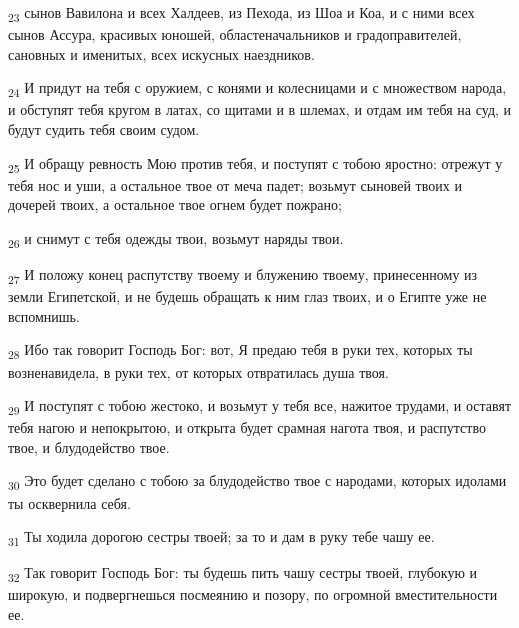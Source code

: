 \begin{tcolorbox}
\textsubscript{23} сынов Вавилона и всех Халдеев, из Пехода, из Шоа и Коа, и с ними всех сынов Ассура, красивых юношей, областеначальников и градоправителей, сановных и именитых, всех искусных наездников.
\end{tcolorbox}
\begin{tcolorbox}
\textsubscript{24} И придут на тебя с оружием, с конями и колесницами и с множеством народа, и обступят тебя кругом в латах, со щитами и в шлемах, и отдам им тебя на суд, и будут судить тебя своим судом.
\end{tcolorbox}
\begin{tcolorbox}
\textsubscript{25} И обращу ревность Мою против тебя, и поступят с тобою яростно: отрежут у тебя нос и уши, а остальное твое от меча падет; возьмут сыновей твоих и дочерей твоих, а остальное твое огнем будет пожрано;
\end{tcolorbox}
\begin{tcolorbox}
\textsubscript{26} и снимут с тебя одежды твои, возьмут наряды твои.
\end{tcolorbox}
\begin{tcolorbox}
\textsubscript{27} И положу конец распутству твоему и блужению твоему, принесенному из земли Египетской, и не будешь обращать к ним глаз твоих, и о Египте уже не вспомнишь.
\end{tcolorbox}
\begin{tcolorbox}
\textsubscript{28} Ибо так говорит Господь Бог: вот, Я предаю тебя в руки тех, которых ты возненавидела, в руки тех, от которых отвратилась душа твоя.
\end{tcolorbox}
\begin{tcolorbox}
\textsubscript{29} И поступят с тобою жестоко, и возьмут у тебя все, нажитое трудами, и оставят тебя нагою и непокрытою, и открыта будет срамная нагота твоя, и распутство твое, и блудодейство твое.
\end{tcolorbox}
\begin{tcolorbox}
\textsubscript{30} Это будет сделано с тобою за блудодейство твое с народами, которых идолами ты осквернила себя.
\end{tcolorbox}
\begin{tcolorbox}
\textsubscript{31} Ты ходила дорогою сестры твоей; за то и дам в руку тебе чашу ее.
\end{tcolorbox}
\begin{tcolorbox}
\textsubscript{32} Так говорит Господь Бог: ты будешь пить чашу сестры твоей, глубокую и широкую, и подвергнешься посмеянию и позору, по огромной вместительности ее.
\end{tcolorbox}
